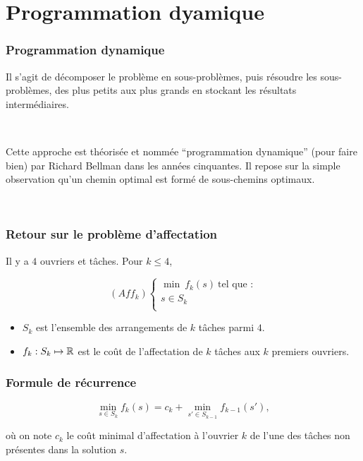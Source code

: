 \documentclass{beamer}
\newcommand{\R}{{\ensuremath\mathbb{R}}}
\begin{document}
\section{Programmation dyamique}

\begin{frame}
  \frametitle{Programmation dynamique}

  Il s'agit de décomposer le problème en sous-problèmes, puis résoudre les sous-problèmes,
  des plus petits aux plus grands en stockant les résultats intermédiaires.

  ~
  
  Cette approche est théorisée et nommée ``programmation dynamique'' (pour faire bien)
  par Richard Bellman dans les années cinquantes. Il repose sur la simple observation
  qu'un chemin optimal est formé de sous-chemins optimaux.

  ~
  
\end{frame}
  
\begin{frame}
  \frametitle{Retour sur le problème d'affectation}

  Il y a $4$ ouvriers et tâches. Pour $k \leq 4$, 

  \[
  (Aff_k) \left\{
  \begin{array}{c}
    \min \ f_k(s) \ \text{tel que :} \\
    s \in S_k \\
  \end{array}
  \right.
  \]

  \begin{itemize}
  \item $S_k$ est l'ensemble des arrangements de $k$ tâches parmi $4$.  
  \item $f_k : S_k \mapsto \R$ est le coût de l'affectation
    de $k$ tâches aux $k$ premiers ouvriers.   
  \end{itemize}

\end{frame}

\begin{frame}
  \frametitle{Formule de récurrence}

  \[ \min_{s \in S_k} f_k(s) = c_k + \min_{s' \in S_{k-1}} f_{k-1}(s'), \]

  où on note $c_k$ le coût minimal d'affectation à l'ouvrier $k$ de
  l'une des tâches non présentes dans la solution $s$. 
  
\end{frame}
\end{document}
